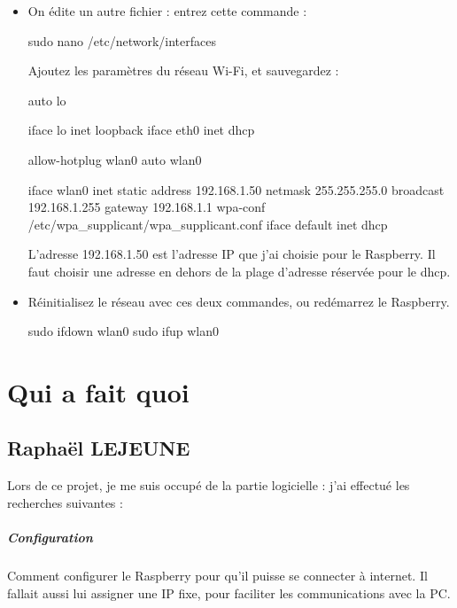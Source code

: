 \documentclass[12pt,a4paper]{report}
\begin{document}
\begin{itemize}
\item On édite un autre fichier : entrez cette commande : 

\bigbreak
\begin{verbatimtab}[3]
sudo nano /etc/network/interfaces
\end{verbatimtab}
\bigbreak

Ajoutez les paramètres du réseau Wi-Fi, et sauvegardez :

\bigbreak
\begin{verbatimtab}[3]
auto lo

iface lo inet loopback
iface eth0 inet dhcp

allow-hotplug wlan0
auto wlan0

iface wlan0 inet static
address 192.168.1.50
netmask 255.255.255.0
broadcast 192.168.1.255
gateway 192.168.1.1
wpa-conf /etc/wpa_supplicant/wpa_supplicant.conf
iface default inet dhcp
\end{verbatimtab}
\bigbreak

L'adresse 192.168.1.50 est l'adresse IP que j'ai choisie pour le Raspberry. Il faut choisir une adresse en dehors de la plage d'adresse réservée pour le dhcp.

\item Réinitialisez le réseau avec ces deux commandes, ou redémarrez le Raspberry.

\bigbreak
\begin{verbatimtab}[3]
sudo ifdown wlan0
sudo ifup wlan0
\end{verbatimtab}
\bigbreak
\end{itemize}

\chapter{Qui a fait quoi}

\section{Raphaël LEJEUNE}

Lors de ce projet, je me suis occupé de la partie logicielle : j'ai effectué les recherches suivantes : 

\paragraph{Configuration} Comment configurer le Raspberry pour qu'il puisse se connecter à internet. Il fallait aussi lui assigner une IP fixe, pour faciliter les communications avec la PC.
\end{document}
